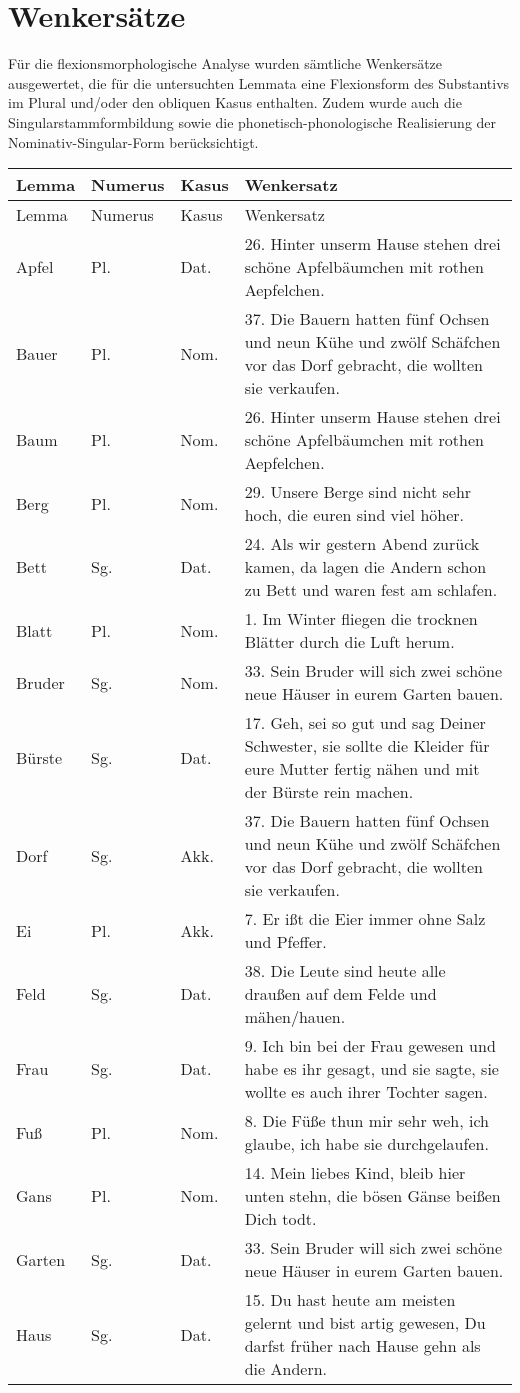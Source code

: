 \chapter{Wenkersätze}
Für die flexionsmorphologische Analyse wurden sämtliche Wenkersätze ausgewertet, die für die untersuchten Lemmata eine Flexionsform des Substantivs im Plural und\slash oder den obliquen Kasus enthalten. Zudem wurde auch die Singularstammformbildung sowie die phonetisch-phonologische Realisierung der Nominativ-Singular-Form berücksichtigt.


\begin{xltabular}{\textwidth}{lllQ}
\lsptoprule Lemma & Numerus & Kasus & Wenkersatz\\\midrule\endfirsthead
\midrule Lemma & Numerus & Kasus & Wenkersatz\\\midrule\endhead
\endfoot\lspbottomrule\endlastfoot
Apfel & Pl. & Dat. & 26. Hinter unserm Hause stehen drei schöne Apfelbäumchen mit rothen Aepfelchen.\\
Bauer & Pl. & Nom. & 37. Die Bauern hatten fünf Ochsen und neun Kühe und zwölf Schäfchen vor das Dorf gebracht, die wollten sie verkaufen.\\
Baum & Pl. & Nom. & 26. Hinter unserm Hause stehen drei schöne Apfelbäumchen mit rothen Aepfelchen.\\
Berg & Pl. & Nom. & 29. Unsere Berge sind nicht sehr hoch, die euren sind viel höher.\\
Bett & Sg. & Dat. & 24. Als wir gestern Abend zurück kamen, da lagen die Andern schon zu Bett und waren fest am schlafen.\\
Blatt & Pl. & Nom. & 1. Im Winter fliegen die trocknen Blätter durch die Luft herum.\\
Bruder & Sg. & Nom. & 33. Sein Bruder will sich zwei schöne neue Häuser in eurem Garten bauen.\\
Bürste & Sg. & Dat. & 17. Geh, sei so gut und sag Deiner Schwester, sie sollte die Kleider für eure Mutter fertig nähen und mit der Bürste rein machen.\\
Dorf & Sg. & Akk. & 37. Die Bauern hatten fünf Ochsen und neun Kühe und zwölf Schäfchen vor das Dorf gebracht, die wollten sie verkaufen.\\
Ei & Pl. & Akk. & 7. Er ißt die Eier immer ohne Salz und Pfeffer.\\
Feld & Sg. & Dat. & 38. Die Leute sind heute alle draußen auf dem Felde und mähen/hauen.\\
Frau & Sg. & Dat. & 9. Ich bin bei der Frau gewesen und habe es ihr gesagt, und sie sagte, sie wollte es auch ihrer Tochter sagen.\\
Fuß & Pl. & Nom. & 8. Die Füße thun mir sehr weh, ich glaube, ich habe sie durchgelaufen.\\
Gans & Pl. & Nom. & 14. Mein liebes Kind, bleib hier unten stehn, die bösen Gänse beißen Dich todt.\\
Garten & Sg. & Dat. & 33. Sein Bruder will sich zwei schöne neue Häuser in eurem Garten bauen.\\
Haus & Sg. & Dat. & 15. Du hast heute am meisten gelernt und bist artig gewesen, Du darfst früher nach Hause gehn als die Andern.


\end{xltabular}
